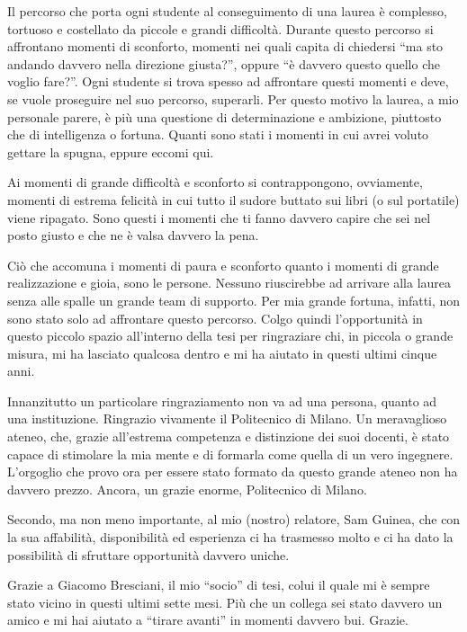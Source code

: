 
Il percorso che porta ogni studente al conseguimento di una laurea è complesso, tortuoso e costellato da piccole e grandi difficoltà. Durante questo percorso si affrontano momenti di sconforto, momenti nei quali capita di chiedersi ``ma sto andando davvero nella direzione giusta?'', oppure ``è davvero questo quello che voglio fare?''. Ogni studente si trova spesso ad affrontare questi momenti e deve, se vuole proseguire nel suo percorso, superarli. Per questo motivo la laurea, a mio personale parere, è più una questione di determinazione e ambizione, piuttosto che di intelligenza o fortuna. Quanti sono stati i momenti in cui avrei voluto gettare la spugna, eppure eccomi qui.

Ai momenti di grande difficoltà e sconforto si contrappongono, ovviamente, momenti di estrema felicità in cui tutto il sudore buttato sui libri (o sul portatile) viene ripagato. Sono questi i momenti che ti fanno davvero capire che sei nel posto giusto e che ne è valsa davvero la pena.

Ciò che accomuna i momenti di paura e sconforto quanto i momenti di grande realizzazione e gioia, sono le persone. Nessuno riuscirebbe ad arrivare alla laurea senza alle spalle un grande team di supporto. Per mia grande fortuna, infatti, non sono stato solo ad affrontare questo percorso. Colgo quindi l'opportunità in questo piccolo spazio all'interno della tesi per ringraziare chi, in piccola o grande misura, mi ha lasciato qualcosa dentro e mi ha aiutato in questi ultimi cinque anni.

Innanzitutto un particolare ringraziamento non va ad una persona, quanto ad una instituzione. Ringrazio vivamente il Politecnico di Milano. Un meravaglioso ateneo, che, grazie all'estrema competenza e distinzione dei suoi docenti, è stato capace di stimolare la mia mente e di formarla come quella di un vero ingegnere. L'orgoglio che provo ora per essere stato formato da questo grande ateneo non ha davvero prezzo. Ancora, un grazie enorme, Politecnico di Milano.

Secondo, ma non meno importante, al mio (nostro) relatore, Sam Guinea, che con la sua affabilità, disponibilità ed esperienza ci ha trasmesso molto e ci ha dato la possibilità di sfruttare opportunità davvero uniche.

Grazie a Giacomo Bresciani, il mio ``socio'' di tesi, colui il quale mi è sempre stato vicino in questi ultimi sette mesi. Più che un collega sei stato davvero un amico e mi hai aiutato a ``tirare avanti'' in momenti davvero bui. Grazie.

